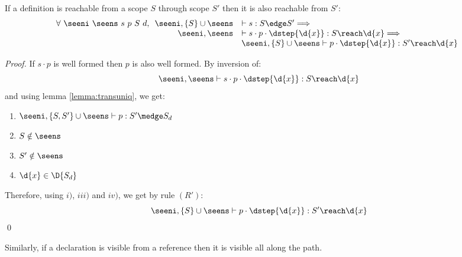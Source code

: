 \begin{lemma} \label{lemma:tailreach} If a definition is reachable from a scope $S$ through scope $S'$ then it is also reachable from $S'$:\\
  \begin{equation*}
   \forall\ \seeni\ \seens\ s\ p\ S\ d,
    \begin{array}[t]{rl}
    \seeni,\{S\}\cup\seens & \vdash s : S \edge S' \Longrightarrow \\  
    \seeni,\seens & \vdash s \cdot p\cdot\dstep{\d{x}} : S \reach \d{x} \Longrightarrow \\
    & \seeni,\{S\}\cup\seens \vdash p\cdot\dstep{\d{x}} : S' \reach \d{x}    
    \end{array} 
  \end{equation*}
   
\end{lemma}
\begin{proof} If $s\cdot p$ is well formed then $p$ is also well formed. By inversion of:
  \begin{equation*}
    \seeni,\seens \vdash s \cdot p \cdot \dstep{\d{x}} : S \reach \d{x} 
  \end{equation*}
and using lemma \ref{lemma:transuniq}, we get:
\begin{enumerate}[leftmargin=15mm]
 \item $\seeni,\{S,S'\}\cup\seens \vdash p : S' \medge S_d $
 \item $S \notin \seens$
 \item $S' \notin \seens$
 \item $\d{x} \in \D{S_d}$
\end{enumerate}
Therefore, using $i)$, $iii)$ and $iv)$, we get by rule $(R')$:
\begin{equation*}
\seeni,\{S\}\cup\seens \vdash p\cdot\dstep{\d{x}} : S' \reach \d{x}   
\end{equation*}\qed
\end{proof}

Similarly, if a declaration is visible from a reference then it is visible all along the path.

